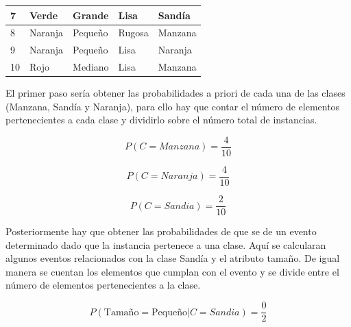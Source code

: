 \documentclass[11pt,fleqn]{book} %
\begin{document}
\begin{table}[ht]
\begin{tabular}{|l|l|l|l|l|}
7                                        & Verde                               & Grande                               & Lisa                                  & Sandía                              \\ \hline
8                                        & Naranja                             & Pequeño                              & Rugosa                                & Manzana                             \\ \hline
9                                        & Naranja                             & Pequeño                              & Lisa                                  & Naranja                             \\ \hline
10                                       & Rojo                                & Mediano                              & Lisa                                  & Manzana                             \\ \hline
\end{tabular}
\end{table}
\FloatBarrier

El primer paso sería obtener las probabilidades a priori de cada una de las clases (Manzana, Sandía y Naranja), para ello hay que contar el número de elementos pertenecientes a cada clase y dividirlo sobre el número total de instancias.

\begin{equation}
P(C=Manzana) = \frac{4}{10}
\label{eqn:prioriManzana} 
\end{equation}

\begin{equation}
P(C=Naranja) = \frac{4}{10}
\label{eqn:prioriNaranja} 
\end{equation}

\begin{equation}
P(C=Sandia) = \frac{2}{10}
\label{eqn:prioriSandia} 
\end{equation}

Posteriormente hay que obtener las probabilidades de que se de un evento determinado dado que la instancia pertenece a una clase. Aquí se calcularan algunos eventos relacionados con la clase Sandía y el atributo tamaño.
De igual manera se cuentan los elementos que cumplan con el evento y se divide entre el número de elementos pertenecientes a la clase.

\begin{equation}
P(\text{Tamaño}=\text{Pequeño} | C=Sandia) = \frac{0}{2}
\label{eqn:tamPeqSandia} 
\end{equation}
\end{document}
